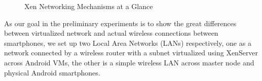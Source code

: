 \documentclass[journal,comsoc]{IEEEtran}
\begin{document}
\begin{figure}
  \centering
  \caption{Xen Networking Mechanisms at a Glance}
  \label{xen_net} %
\end{figure}

As our goal in the preliminary experiments is to show the great differences between virtualized network and actual wireless connections between smartphones, we set up two Local Area Networks (LANs) respectively, one as a network connected by a wireless router with a subnet virtualized using XenServer across Android VMs, the other is a simple wireless LAN across master node and physical Android smartphones. 
\end{document}
